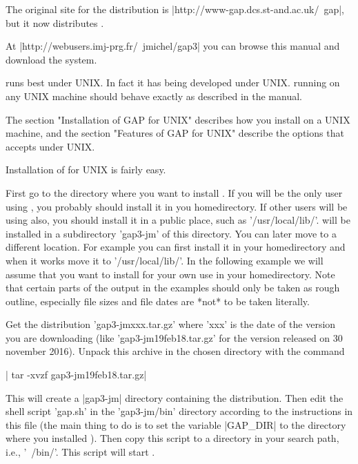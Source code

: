 The original site for the distribution is
|http://www-gap.dcs.st-and.ac.uk/~gap|, but it now distributes {}.

At  |http://webusers.imj-prg.fr/~jmichel/gap3| you  can browse  this manual
and download the system.

%

{\GAP}  runs best under UNIX.  In fact it has  being developed under UNIX.
{\GAP}  running on any UNIX machine  should behave exactly as described in
the manual.

The  section  "Installation  of  GAP  for  UNIX"  describes how you install
{\GAP}  on a  UNIX machine,  and the  section "Features  of GAP  for UNIX"
describe the options that {\GAP} accepts under UNIX.

%

Installation of {\GAP} for UNIX is fairly easy.

First go to the directory where you want to install {\GAP}. If you will be
the  only  user  using  {\GAP},  you  probably  should  install  it in you
homedirectory.  If  other  users  will  be  using  {\GAP} also, you should
install  it in a  public place, such  as '/usr/local/lib/'. {\GAP} will be
installed in a subdirectory 'gap3-jm' of this directory. You can later move
{\GAP}  to a different location.  For example you can  first install it in
your  homedirectory and when it works  move it to '/usr/local/lib/'. In the
following  example we will assume that you want to install {\GAP} for your
own use in your homedirectory. Note that certain parts of the output in the
examples  should only be taken as  rough outline, especially file sizes and
file dates are *not* to be taken literally.

Get  the distribution  'gap3-jmxxx.tar.gz' where  'xxx' is  the date of the
version  you are downloading (like  'gap3-jm19feb18.tar.gz' for the version
released  on 30 november 2016). Unpack this archive in the chosen directory
with the command

|   tar -xvzf gap3-jm19feb18.tar.gz|

This  will create a |gap3-jm| directory containing the {\GAP} distribution.
Then  edit  the  shell  script  'gap.sh'  in  the  'gap3-jm/bin'  directory
according  to the instructions in this file (the main thing to do is to set
the  variable |GAP_DIR| to the directory  where you installed {\GAP}). Then
copy  this script to a directory in  your search path, i.e., '~/bin/'. This
script will start {\GAP}.

